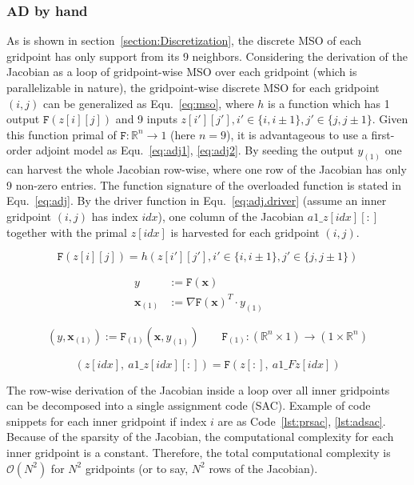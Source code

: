 \documentclass[11pt]{scrartcl}
\newcommand{\rb}[1]{\left( #1 \right)}
\begin{document}
\subsubsection{AD by hand}
As is shown in section~\ref{section:Discretization}, the discrete MSO of each gridpoint has only support from its 9 neighbors. Considering the derivation of the Jacobian as a loop of gridpoint-wise MSO over each gridpoint (which is parallelizable in nature), the gridpoint-wise discrete MSO for each gridpoint $(i,j)$ can be generalized as Equ.~\eqref{eq:mso}, where $h$ is a function which has 1 output $\mathtt{F}\rb{z[i][j]}$ and 9 inputs $z[i'][j'], i'\in\{i, i\pm1\}, j'\in\{j,j\pm1\}$. Given this function primal of $ \mathtt{F}: \mathbb{R}^n\rightarrow 1 $ (here $n=9$), it is advantageous to use a first-order adjoint model as Equ.~\eqref{eq:adj1}, \eqref{eq:adj2}. By seeding the output $y_{(1)}$ one can harvest the whole Jacobian row-wise, where one row of the Jacobian has only 9 non-zero entries. The function signature of the overloaded function is stated in Equ.~\eqref{eq:adj}. By the driver function in Equ.~\eqref{eq:adj.driver} (assume an inner gridpoint $(i,j)$ has index $idx$), one column of the Jacobian $a1\_z[idx][:]$ together with the primal $z[idx]$ is harvested for each gridpoint $(i,j)$.

\begin{equation}
\mathtt{F}\rb{z[i][j]} = h\rb{z[i'][j'], i'\in\{i, i\pm1\}, j'\in\{j,j\pm1\}}\label{eq:mso}
\end{equation}

\begin{align}
y &:= \mathtt{F}(\textbf{x})\label{eq:adj1} &&
\\
\textbf{x}_{(1)} &:= \nabla \mathtt{F}(\textbf{x})^{T} \cdot y_{(1)}\label{eq:adj2}
\end{align}

\begin{equation}
\rb{y, \textbf{x}_{(1)}} := \mathtt{F}_{(1)}\rb{\textbf{x}, y_{(1)}}\qquad \mathtt{F}_{(1)}: \rb{\mathbb{R}^n\times 1}\rightarrow \rb{1\times\mathbb{R}^n}\label{eq:adj}
\end{equation}

\begin{equation}
\rb{z[idx],\ a1\_z[idx][:]} = \mathtt{F}\rb{z[:],\ a1\_Fz[idx]}
\label{eq:adj.driver}
\end{equation}

The row-wise derivation of the Jacobian inside a loop over all inner gridpoints can be decomposed into a single assignment code (SAC). Example of code snippets for each inner gridpoint if index $i$ are as Code~\ref{lst:prsac}, \ref{lst:adsac}. Because of the sparsity of the Jacobian, the computational complexity for each inner gridpoint is a constant. Therefore, the total computational complexity is $\mathcal{O}(N^2)$ for $N^2$ gridpoints (or to say, $N^2$ rows of the Jacobian).
\end{document}
